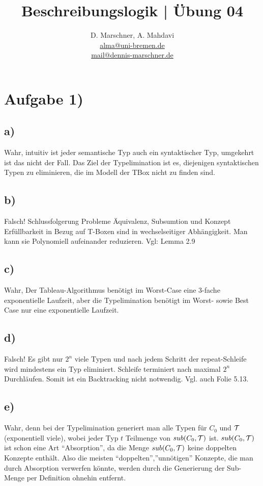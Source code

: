 \documentclass[12pt]{article}
\begin{document}
 
\title{Beschreibungslogik | Übung 04}
\author{D. Marschner, A. Mahdavi\\
\href{mailto:alma@uni-bremen.de}{alma@uni-bremen.de}\\
\href{mailto:mail@dennis-marschner.de}{mail@dennis-marschner.de}
}
\date{}
\maketitle
\section*{Aufgabe 1)}
\subsection*{a)}
Wahr, intuitiv ist jeder semantische Typ auch ein syntaktischer Typ, umgekehrt ist das nicht der Fall. Das Ziel der Typelimination ist es, diejenigen syntaktischen Typen zu eliminieren, die im Modell der TBox nicht zu finden sind.
\subsection*{b)}
Falsch! Schlussfolgerung Probleme Äquivalenz, Subsumtion und Konzept Erfüllbarkeit in Bezug auf T-Boxen sind in wechselseitiger Abhängigkeit. Man kann sie Polynomiell aufeinander reduzieren. 
Vgl: Lemma 2.9
\subsection*{c)}
Wahr, Der Tableau-Algorithmus benötigt im Worst-Case eine 3-fache exponentielle Laufzeit, aber die Typelimination benötigt  im Worst- sowie Best Case nur eine exponentielle Laufzeit.
\subsection*{d)}
Falsch! Es gibt nur $2^n$ viele Typen und nach jedem Schritt der repeat-Schleife wird mindestens ein Typ eliminiert. Schleife terminiert nach maximal $2^n$ Durchläufen. Somit ist ein Backtracking nicht notwendig. Vgl. auch Folie 5.13.
\subsection*{e)}
Wahr, denn bei der Typelimination generiert man alle Typen für $C_0$ und $\mathcal{T}$ (exponentiell viele), wobei jeder Typ $t$ Teilmenge von $sub(C_0, \mathcal{T})$ ist. $sub(C_0, \mathcal{T})$ ist schon eine Art “Absorption”, da die Menge $sub(C_0,\mathcal{T})$ keine doppelten Konzepte enthält. Also die meisten “doppelten”,”unnötigen” Konzepte, die man durch Absorption verwerfen könnte, werden durch die Generierung der Sub-Menge per Definition ohnehin entfernt.
\end{document}
